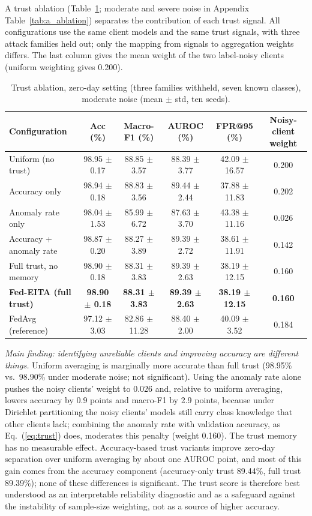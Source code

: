 \documentclass[pdflatex,sn-mathphys-num]{sn-jnl}
\begin{document}
{{A trust ablation (Table~\ref{tab:ablation_main}; moderate and severe noise in Appendix Table~\ref{tab:a_ablation}) separates the contribution of each trust signal. All configurations use the same client models and the same trust signals, with three attack families held out; only the mapping from signals to aggregation weights differs. The last column gives the mean weight of the two label-noisy clients (uniform weighting gives 0.200).

\begin{table}[!htbp]\centering
\color{black}
\caption{Trust ablation, zero-day setting (three families withheld, seven known classes), moderate noise (mean $\pm$ std, ten seeds).}\label{tab:ablation_main}
\footnotesize
\setlength{\tabcolsep}{4pt}
\begin{tabular}{lccccc}\toprule
Configuration & Acc (\%) & Macro-F1 (\%) & AUROC (\%) & FPR@95 (\%) & Noisy-client weight \\ \midrule
Uniform (no trust) & 98.95 $\pm$ 0.17 & 88.85 $\pm$ 3.57 & 88.39 $\pm$ 3.77 & 42.09 $\pm$ 16.57 & 0.200 \\
Accuracy only & 98.94 $\pm$ 0.18 & 88.83 $\pm$ 3.56 & 89.44 $\pm$ 2.44 & 37.88 $\pm$ 11.83 & 0.202 \\
Anomaly rate only & 98.04 $\pm$ 1.53 & 85.99 $\pm$ 6.72 & 87.63 $\pm$ 3.70 & 43.38 $\pm$ 11.16 & 0.026 \\
Accuracy + anomaly rate & 98.87 $\pm$ 0.20 & 88.27 $\pm$ 3.89 & 89.39 $\pm$ 2.72 & 38.61 $\pm$ 11.91 & 0.142 \\
Full trust, no memory & 98.90 $\pm$ 0.18 & 88.31 $\pm$ 3.83 & 89.39 $\pm$ 2.63 & 38.19 $\pm$ 12.15 & 0.160 \\
\textbf{Fed-EITA (full trust)} & \textbf{98.90 $\pm$ 0.18} & \textbf{88.31 $\pm$ 3.83} & \textbf{89.39 $\pm$ 2.63} & \textbf{38.19 $\pm$ 12.15} & \textbf{0.160} \\
FedAvg (reference) & 97.12 $\pm$ 3.03 & 82.86 $\pm$ 11.28 & 88.40 $\pm$ 2.00 & 40.09 $\pm$ 3.52 & 0.184 \\
\bottomrule\end{tabular}
\end{table}
\emph{Main finding: identifying unreliable clients and improving accuracy are different things.} Uniform averaging is marginally more accurate than full trust (98.95\% vs.\ 98.90\% under moderate noise; not significant). Using the anomaly rate alone pushes the noisy clients' weight to 0.026 and, relative to uniform averaging, lowers accuracy by 0.9 points and macro-F1 by 2.9 points, because under Dirichlet partitioning the noisy clients' models still carry class knowledge that other clients lack; combining the anomaly rate with validation accuracy, as Eq.~(\ref{eq:trust}) does, moderates this penalty (weight 0.160). The trust memory has no measurable effect. Accuracy-based trust variants improve zero-day separation over uniform averaging by about one AUROC point, and most of this gain comes from the accuracy component (accuracy-only trust 89.44\%, full trust 89.39\%); none of these differences is significant. The trust score is therefore best understood as an interpretable reliability diagnostic and as a safeguard against the instability of sample-size weighting, not as a source of higher accuracy.

}}
\end{document}
